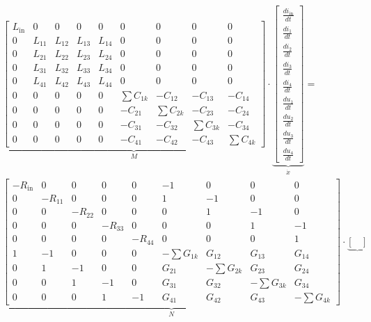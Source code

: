 \begin{refsection}
{\footnotesize 
\begin{align}
			&
			\underbrace{\begin{bmatrix}
			L_\mathrm{in}&0&0&0&0 & 0&0&0&0 \\
			0&L_{11}&L_{12}&L_{13}&L_{14} & 0&0&0&0 \\
			0&L_{21}&L_{22}&L_{23}&L_{24} & 0&0&0&0 \\
			0&L_{31}&L_{32}&L_{33}&L_{34} & 0&0&0&0 \\
			0&L_{41}&L_{42}&L_{43}&L_{44} & 0&0&0&0 \\
			0&0&0&0&0 & \sum{C_{1k}}&-C_{12}&-C_{13}&-C_{14} \\
			0&0&0&0&0 & -C_{21}&\sum{C_{2k}}&-C_{23}&-C_{24} \\
			0&0&0&0&0 & -C_{31}&-C_{32}&\sum{C_{3k}}&-C_{34} \\
			0&0&0&0&0 & -C_{41}&-C_{42}&-C_{43}&\sum{C_{4k}}
			    \end{bmatrix}}_{\displaystyle M}
			\cdot
			\underbrace{\begin{bmatrix}
			\frac{di_\mathrm{in}}{dt} \\
			\frac{di_1}{dt} \\
			\frac{di_2}{dt} \\
			\frac{di_3}{dt} \\
			\frac{di_4}{dt} \\
			\frac{du_1}{dt} \\
			\frac{du_2}{dt} \\
			\frac{du_3}{dt} \\
			\frac{du_4}{dt}
			\end{bmatrix}}_{\displaystyle \dot{x}}
			= \nonumber \\
			&
			\underbrace{\begin{bmatrix}
			-R_\mathrm{in}&0&0&0&0 & -1&0&0&0 \\
			0&-R_{11}&0&0&0 & 1&-1&0&0 \\
			0&0&-R_{22}&0&0 & 0&1&-1&0 \\
			0&0&0&-R_{33}&0 & 0&0&1&-1 \\
			0&0&0&0&-R_{44} & 0&0&0&1 \\
			1&-1&0&0&0 & -\sum G_{1k}&G_{12}&G_{13}&G_{14} \\
			0&1&-1&0&0 & G_{21} &- \sum G_{2k}& G_{23}& G_{24} \\
			0&0&1&-1&0 & G_{31} & G_{32} &-\sum G_{3k}&G_{34} \\
			0&0&0&1&-1 & G_{41}&G_{42}&G_{43}&-\sum G_{4k}
			\end{bmatrix}}_{\displaystyle N}
			\cdot
			\underbrace{\begin{bmatrix}

\end{bmatrix}}
\end{align}}
\end{refsection}
